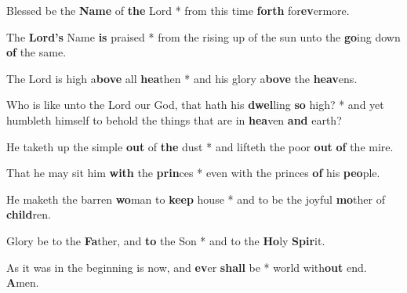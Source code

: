 \begin{multicols}{2}
	Blessed be the \textbf{Name} of \textbf{the} Lord * from this time \textbf{forth} for\textbf{ev}ermore.
	
	The \textbf{Lord's} Name \textbf{is} praised * from the rising up of the sun unto the \textbf{go}ing down \textbf{of} the same.
	
	The Lord is high a\textbf{bove} all \textbf{ hea}then * and his glory a\textbf{bove} the \textbf{heav}ens.
	
	Who is like unto the Lord our God, that hath his \textbf{dwel}ling \textbf{so} high? * and yet humbleth himself to behold the things that are in \textbf{hea}ven \textbf{and} earth?
	
	He taketh up the simple \textbf{out} of \textbf{the} dust * and lifteth the poor \textbf{out} \textbf{of} the mire.
	
	That he may sit him \textbf{with} the \textbf{prin}ces * even with the princes \textbf{of} his \textbf{peo}ple.
	
	He maketh the barren \textbf{wo}man to \textbf{keep} house * and to be the joyful \textbf{mo}ther of \textbf{child}ren.
	
	Glory be to the \textbf{Fa}ther, and \textbf{to} the Son * and to the \textbf{Ho}ly \textbf{Spir}it.
	
	As it was in the beginning is now, and \textbf{ev}er \textbf{shall} be * world with\textbf{out} end. \textbf{A}men.
\end{multicols}